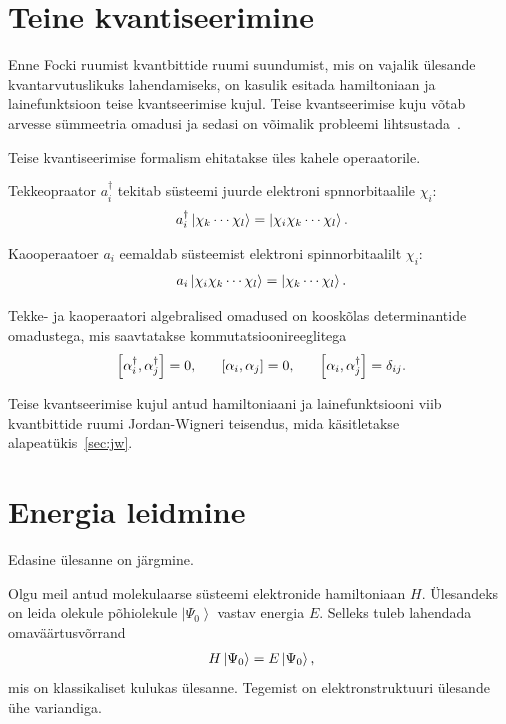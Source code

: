 \documentclass[12pt]{report}
\def\sparen#1{\left[#1\right]}
\def\ket#1{\left|#1\right>}
\begin{document}
\section{Teine kvantiseerimine}\label{sec:secquant}

Enne Focki ruumist kvantbittide ruumi suundumist, mis on vajalik ülesande kvantarvutuslikuks lahendamiseks, on kasulik esitada hamiltoniaan ja lainefunktsioon teise kvantseerimise kujul.
Teise kvantseerimise kuju võtab arvesse sümmeetria omadusi ja sedasi on võimalik probleemi lihtsustada~\cite{kassal+etal, yung+etal}.

Teise kvantiseerimise formalism ehitatakse üles kahele operaatorile.

Tekkeopraator \(a_i^\dagger\) tekitab süsteemi juurde elektroni spnnorbitaalile \(\chi_i\):
\begin{align}
    a_i^\dagger \ket{\chi_k \cdots \chi_l} = \ket{\chi_i \chi_k \cdots \chi_l} \rlap{.}
\end{align}

Kaooperaatoer \(a_i\) eemaldab süsteemist elektroni spinnorbitaalilt \(\chi_i\):
\begin{align}
    a_i \ket{\chi_i \chi_k \cdots \chi_l} = \ket{\chi_k \cdots \chi_l}\rlap{.}
\end{align}

Tekke- ja kaoperaatori algebralised omadused on kooskõlas determinantide omadustega, mis saavtatakse kommutatsioonireeglitega
\begin{align}
    \sparen{\alpha_i^\dagger, \alpha_j^\dagger} = 0 \rlap{,}
    \qquad \sparen{\alpha_i, \alpha_j} = 0 \rlap{,}
    \qquad \sparen{\alpha_i, \alpha_j^\dagger} = \delta_{ij} \rlap{.}
\end{align}

Teise kvantseerimise kujul antud hamiltoniaani ja lainefunktsiooni viib kvantbittide ruumi Jordan-Wigneri teisendus, mida käsitletakse alapeatükis~\ref{sec:jw}.

\section{Energia leidmine}

Edasine ülesanne on järgmine.

Olgu meil antud molekulaarse süsteemi elektronide hamiltoniaan \(H\).
Ülesandeks on leida olekule põhiolekule \(\ket{\Psi_0}\) vastav energia \(E\).
Selleks tuleb lahendada omaväärtusvõrrand
\begin{align}
    H \ket{\Psi_0} = E \ket{\Psi_0} \rlap{,}
\end{align}
mis on klassikaliset kulukas ülesanne.
Tegemist on elektronstruktuuri ülesande ühe variandiga.
\end{document}
